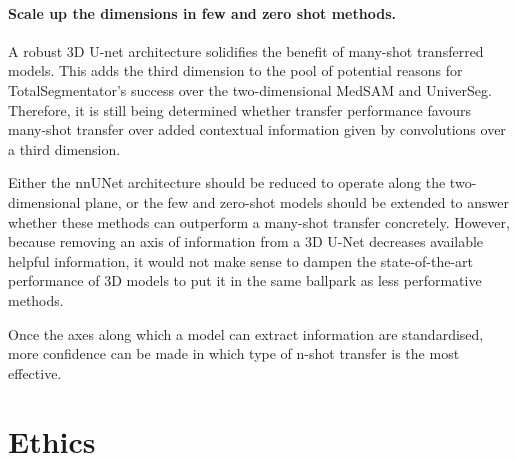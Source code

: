 \documentclass[11pt,twoside]{report}
\begin{document}
\subsubsection{Scale up the dimensions in few and zero shot methods.}

A robust 3D U-net architecture solidifies the benefit of many-shot transferred models. This adds the third dimension to the pool of potential reasons for TotalSegmentator's success over the two-dimensional MedSAM and UniverSeg. Therefore, it is still being determined whether transfer performance favours many-shot transfer over added contextual information given by convolutions over a third dimension.

Either the nnUNet architecture should be reduced to operate along the two-dimensional plane, or the few and zero-shot models should be extended to answer whether these methods can outperform a many-shot transfer concretely. However, because removing an axis of information from a 3D U-Net decreases available helpful information, it would not make sense to dampen the state-of-the-art performance of 3D models to put it in the same ballpark as less performative methods.

Once the axes along which a model can extract information are standardised, more confidence can be made in which type of n-shot transfer is the most effective.





\chapter{Ethics}
\end{document}

